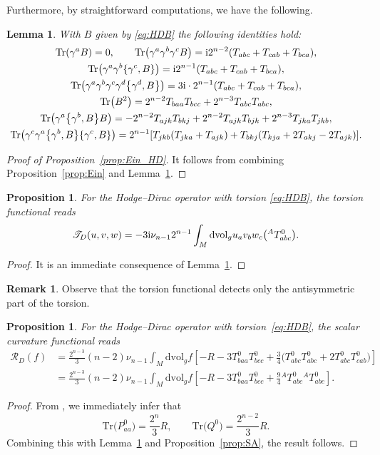 \documentclass[10pt,a4paper]{amsart}
\numberwithin{equation}{section}
\newtheorem{Lemma}[Theorem]{Lemma}
\newtheorem{Proposition}[Theorem]{Proposition}
\theoremstyle{definition}
\newtheorem{Remark}[Theorem]{Remark}
\def\Tr{\mathrm{Tr}}
\def\dv{\mathrm{dvol}_g}
\begin{document}
Furthermore, by straightforward computations, we have the following.
\begin{Lemma}
	\label{lemma:TRB}
	With $B$ given by \eqref{eq:HDB} the following identities hold:
	\begin{gather*}
			 \Tr(\gamma^aB)=0, \qquad
			 \Tr\bigl(\gamma^a\gamma^b\gamma^cB\bigr)={\rm i} 2^{n-2}(T_{abc}+T_{cab}+T_{bca}),\\
			\Tr\bigl(\gamma^a\gamma^b\{\gamma^c,B\}\bigr)={\rm i} 2^{n-1}(T_{abc}+T_{cab}+T_{bca}),\\
			 \Tr\bigl(\gamma^a\gamma^b\gamma^c\gamma^d\bigl\{\gamma^d,B\bigr\}\bigr)=3{\rm i}\cdot 2^{n-1} (T_{abc}+T_{cab}+T_{bca}),\\
			 \Tr\bigl(B^2\bigr)=2^{n-2}T_{baa}T_{bcc}+2^{n-3}T_{abc}T_{abc},\\
			 \Tr\bigl(\gamma^a\bigl\{\gamma^b,B\bigr\}B\bigr)=
			-2^{n-2}T_{ajk}T_{bkj}+2^{n-2}T_{ajk}T_{bjk}+2^{n-3}T_{jka}T_{jkb}, \\
			\Tr\bigl(\gamma^c\gamma^a\bigl\{\gamma^b,B\bigr\}\{\gamma^c,B\}\bigr)=2^{n-1}[T_{jkb}(T_{jka}+T_{ajk})+T_{bkj}(T_{kja}+2T_{akj}-2T_{ajk})].	
	\end{gather*}
\end{Lemma}
\begin{proof}[Proof of Proposition~\ref{prop:Ein_HD}]
It follows from combining Proposition~\ref{prop:Ein} and Lemma~\ref{lemma:TRB}.
\end{proof}

\begin{Proposition}
 For the Hodge--Dirac operator with torsion \eqref{eq:HDB}, the torsion functional reads
 \[
 \mathscr{T}_D(u,v,w)= - 3 {\rm i}\nu_{n-1}2^{n-1}\int_M \dv u_{a}v_bw_c \bigl({}^AT^{0}_{abc}\bigr).
 \]
\end{Proposition}
\begin{proof}
 It is an immediate consequence of Lemma~\ref{lemma:TRB}.
\end{proof}

\begin{Remark}
Observe that the torsion functional detects only the antisymmetric part of the torsion.
\end{Remark}
\begin{Proposition}
 \label{prop:HD_SA}
 For the Hodge--Dirac operator with torsion~\eqref{eq:HDB}, the scalar curvature functional reads
 \begin{align*}
 \mathscr{R}_D(f)&=\frac{2^{n-3}}{3}(n-2)\nu_{n-1}\int_M \dv f\left[-R-3T^0_{baa} T^0_{bcc}
 +\frac{3}{4}\bigl(T^0_{abc}T^0_{abc}+2T^0_{abc}T^0_{cab}\bigr)\right]\\
 &=\frac{2^{n-3}}{3}(n-2)\nu_{n-1}\int_M \dv f\left[-R-3T^0_{baa}T^0_{bcc}+\frac{9}{4}{}^A T^{0}_{abc} {}^A T^{0}_{abc}\right].
 \end{align*}
\end{Proposition}
\begin{proof}
 From \cite[Lemma~2.1]{dabrowski2024a}, we immediately infer that
 \[
 \Tr\bigl(P^0_{aa}\bigr)=\frac{2^n}{3}R, \qquad \Tr\bigl(Q^0\bigr)=\frac{2^{n-2}}{3}R.
 \]
 Combining this with Lemma~\ref{lemma:TRB} and Proposition~\ref{prop:SA}, the result follows.
\end{proof}
\end{document}
